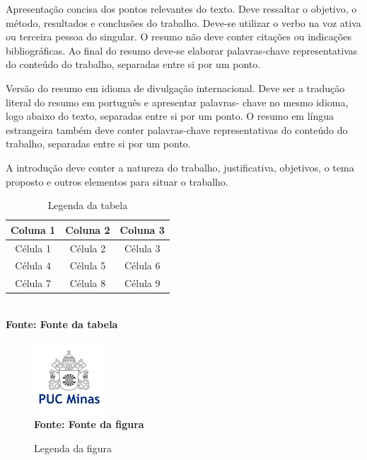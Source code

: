 \documentclass{abntpuc}
\begin{document}

\resumo
{
	Apresentação concisa dos pontos relevantes do texto. Deve ressaltar o objetivo, o método, resultados e conclusões do trabalho. Deve-se utilizar o verbo na voz ativa ou terceira pessoa do singular. O resumo não deve conter citações ou indicações bibliográficas.
} %
{
	Ao final do resumo deve-se elaborar palavras-chave representativas do conteúdo do trabalho, separadas entre si por um ponto.
} %


\abstract
{
	Versão do resumo em idioma de divulgação internacional. Deve ser a tradução literal do resumo em português e apresentar palavras- chave no mesmo idioma, logo abaixo do texto, separadas entre si por um ponto.
} %
{
	O resumo em língua estrangeira também deve conter palavras-chave representativas do conteúdo do trabalho, separadas entre si por um ponto.
} %


\listafiguras
\listatabelas
{}
\sumario



\iniciocapitulo
A introdução deve conter a natureza do trabalho, justificativa, objetivos, o tema proposto e outros elementos para situar o trabalho.\par


\begin{table}[!htb]
	\caption[Descrição na Lista de Tabelas]{Legenda da tabela}
	\centering
	\label{tab:tabela}
	\begin{tabular}{c|c|c}
		\hline
		Coluna 1 & Coluna 2 & Coluna 3 \\
		\hline
 		Célula 1 & Célula 2 & Célula 3 \\
		Célula 4 & Célula 5 & Célula 6 \\
		Célula 7 & Célula 8 & Célula 9 \\
		\hline
	\end{tabular}
	\\ \textbf{\footnotesize Fonte: Fonte da tabela}
\end{table}


\begin{figure}[!htb]
   \caption[Descrição na Lista de Figuras]{Legenda da figura}
   \label{fig:figura1}
   \centering
   \includegraphics{LogoPUC.jpg}
   \\ \textbf{\footnotesize Fonte: Fonte da figura}
\end{figure}
\end{document}

